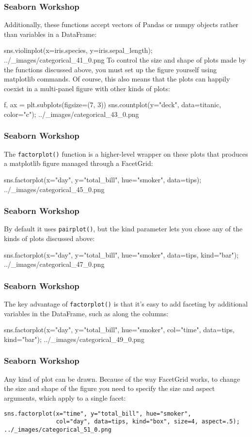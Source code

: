 \begin{frame}[fragile]
	\frametitle{Seaborn Workshop}
	\large
	
Additionally, these functions accept vectors of Pandas or numpy objects rather than variables in a DataFrame:

sns.violinplot(x=iris.species, y=iris.sepal_length);
../_images/categorical_41_0.png
To control the size and shape of plots made by the functions discussed above, you must set up the figure yourself using matplotlib commands. Of course, this also means that the plots can happily coexist in a multi-panel figure with other kinds of plots:

f, ax = plt.subplots(figsize=(7, 3))
sns.countplot(y="deck", data=titanic, color="c");
../_images/categorical_43_0.png
\end{frame}
\begin{frame}[fragile]
	\frametitle{Seaborn Workshop}
	\large
	
The \texttt{factorplot()} function is a higher-level wrapper on these plots that produces a matplotlib figure managed through a FacetGrid:

sns.factorplot(x="day", y="total_bill", hue="smoker", data=tips);
../_images/categorical_45_0.png
\end{frame}
\begin{frame}[fragile]
	\frametitle{Seaborn Workshop}
	\large
	
By default it uses \texttt{pairplot()}, but the kind parameter lets you chose any of the kinds of plots discussed above:

sns.factorplot(x="day", y="total_bill", hue="smoker", data=tips, kind="bar");
../_images/categorical_47_0.png
\end{frame}
\begin{frame}[fragile]
	\frametitle{Seaborn Workshop}
	\large
	
The key advantage of \texttt{factorplot()} is that it’s easy to add faceting by additional variables in the DataFrame, such as along the columns:

sns.factorplot(x="day", y="total_bill", hue="smoker",
               col="time", data=tips, kind="bar");
../_images/categorical_49_0.png
\end{frame}
\begin{frame}[fragile]
	\frametitle{Seaborn Workshop}
	\large
	
Any kind of plot can be drawn. Because of the way FacetGrid works, to change the size and shape of the figure you need to specify the size and aspect arguments, which apply to a single facet:
\begin{verbatim}
sns.factorplot(x="time", y="total_bill", hue="smoker",
               col="day", data=tips, kind="box", size=4, aspect=.5);
../_images/categorical_51_0.png
\end{verbatim}
\end{frame}
